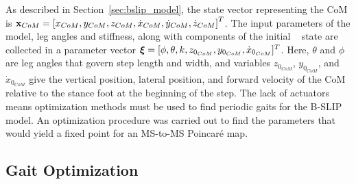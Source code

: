 As described in Section~\ref{sec:bslip_model}, the state vector representing the CoM is $ \mathbf{x}_{CoM} = \left[x_{CoM} ,y_{CoM} ,z_{CoM} ,\dot{x}_{CoM} ,\dot{y}_{CoM} ,\dot{z}_{CoM}\right]^T $. The input parameters of the model, leg angles and stiffness, along with components of the initial \com~ state are collected in a parameter vector $ \boldsymbol{\xi} = [\phi, \theta ,k ,z_{0_{CoM}} ,y_{0_{CoM}} ,\dot{x}_{0_{CoM}}]^T $. Here, $ \theta $ and $ \phi $ are leg angles that govern step length and width, and variables $ z_{0_{CoM}}$, $y_{0_{CoM}}$, and $\dot{x}_{0_{CoM}} $ give the vertical position, lateral position, and forward velocity of the CoM relative to the stance foot at the beginning of the step. The lack of actuators means optimization methods must be used to find periodic gaits for the B-SLIP model. An optimization procedure was carried out to find the parameters that would yield a fixed point for an MS-to-MS Poincar\'e map.

\subsection{Gait Optimization}
%	

